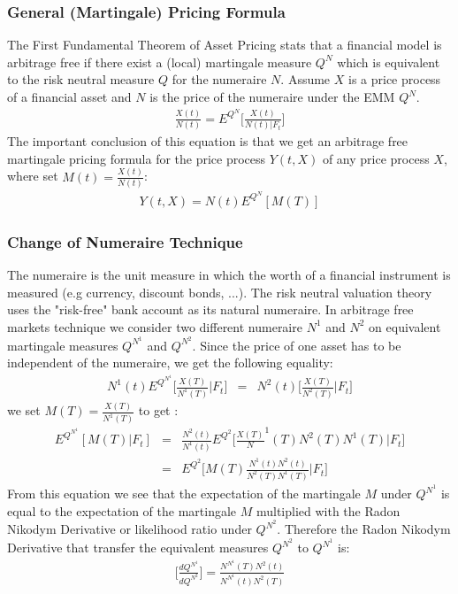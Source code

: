 \documentclass[11pt]{article}
\numberwithin{equation}{subsection}
\begin{document}
\subsubsection{General (Martingale) Pricing Formula}		
The First Fundamental Theorem of Asset Pricing stats that a financial model is arbitrage free if there exist a (local) martingale measure \(Q^N\) which is equivalent to the risk neutral measure \(Q\) for the numeraire \(N\). Assume \(X\) is a price process of a financial asset and \(N\) is the price of the numeraire under the EMM \(Q^N\).
\begin{eqnarray}
	\frac{X(t)}{N(t)} = E^{Q^N}\bigg[\frac{X(t)}{N(t)| F_t}\bigg]
\end{eqnarray}
The important conclusion of this equation is that we get an arbitrage free martingale pricing formula for the price process \(Y(t, X)\) of any price process \(X\), where set \(M(t)=\frac{X(t)}{N(t)}\):
\begin{eqnarray}
	Y(t, X) = N(t) E^{Q^{N}} [M(T)]
\end{eqnarray}
\subsubsection{Change of Numeraire Technique}
The numeraire is the unit measure in which the worth of a financial instrument is measured (e.g currency, discount bonds, ...). The risk neutral valuation theory uses the "risk-free" bank account as its natural numeraire. In arbitrage free markets technique we consider two different numeraire \(N^1\) and \(N^2\) on equivalent martingale measures \(Q^{N^1}\) and \(Q^{N^2}\). Since the price of one asset has to be independent of the numeraire, we get the following equality:
\begin{eqnarray}
	N^{1}(t) E^{Q^{N^1}} \bigg[\frac{X(T)}{N^1(T)}|F_t\bigg] &=& N^{2}(t) \bigg[\frac{X(T)}{N^2(T)}|F_t\bigg]
\end{eqnarray}	
we set \(M(T) = \frac{X(T)}{N^1(T)}\) to get :
\begin{eqnarray}
	 E^{Q^{N^1}}[M(T)|F_t]  &=& \frac{N^2(t)}{N^1(t)} E^{Q^{2}} \bigg[\frac{X(T)}N^1(T){N^2(T)N^1(T)}|F_t\bigg] \\
	 &=& E^{Q^{2}} \bigg[M(T) \frac{N^1(t)N^2(t)}{N^2(T)N^1(T)}|F_t\bigg]
\end{eqnarray}
From this equation we see that the expectation of the martingale \(M\) under \(Q^{N^1}\) is equal to the expectation of the martingale \(M\) multiplied with the Radon Nikodym Derivative or likelihood ratio under \(Q^{N^2}\). Therefore the Radon Nikodym Derivative that transfer the equivalent measures \(Q^{N^2}\) to \(Q^{N^1}\) is:
\begin{eqnarray}
	\bigg[\frac{dQ^{N^1}}{dQ^{N^2}}\bigg] = \frac{N^{N^1}(T) N^2(t)}{N^{N^1}(t) N^2(T)}
\end{eqnarray}
\end{document}
